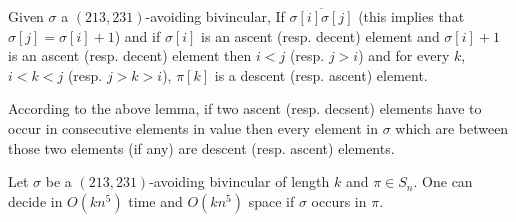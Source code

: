 \documentclass[a4paper]{llncs}
\newcommand{\pmotif}{\sigma}
\begin{document}
\begin{lemma}
\label{lemma:ascentDescentAscent}
Given $\pmotif$ a $(213,231)$-avoiding bivincular,
If $\overline{\sigma[i]\sigma[j]}$ (this implies that $\sigma[j]=\sigma[i]+1$) and 
if $\sigma[i]$ is an ascent (resp. decent) element and $\sigma[i]+1$ is an ascent 
(resp. decent) element then 
$i<j$ (resp. $j>i$) and for every $k$, $i<k<j$ (resp. $j>k>i$), $\pi[k]$ is a descent 
(resp. ascent) element.    
\end{lemma}

According to the above lemma,
if two ascent (resp. decsent) elements
have to occur in consecutive elements in value then every element in 
$\pmotif$ which are between those two elements (if any) are descent (resp. ascent) 
elements. 

\begin{proposition}
\label{Proposition:bivincular pattern}
Let $\sigma$ be a $(213,231)$-avoiding bivincular of length $k$
and $\pi \in S_n$.
One can decide in $O(kn^5)$ time
and $O(kn^5)$ space if $\sigma$ occurs in $\pi$.
\end{proposition}
\end{document}
